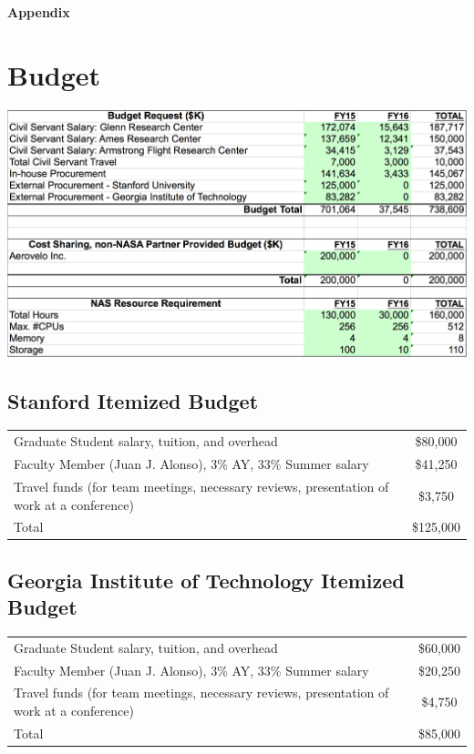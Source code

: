 \documentclass[]{aiaa-tc}
\begin{document}
  \clearpage
  

  

  \begin{landscape}
  \appendix
  \clearpage
  \centerline{\huge{\textbf{Appendix}}}
  \section{Budget}
    \centering
    \includegraphics[height=\textheight]{images/budget_request}
    \end{landscape}

  \subsection*{Stanford Itemized Budget}
    \begin{table}\begin{tabular}{l c}
    Graduate Student salary, tuition, and overhead &  \$80,000 \\
    Faculty Member (Juan J. Alonso), 3\% AY, 33\% Summer salary & \$41,250 \\
    Travel funds (for team meetings, necessary reviews, presentation of work at a conference) & \$3,750 \\
    \hline
    Total & \$125,000 \\ 
    \hline
    \end{tabular}\end{table}
  \subsection*{Georgia Institute of Technology Itemized Budget}

    \begin{table}\begin{tabular}{l c}
    Graduate Student salary, tuition, and overhead &  \$60,000 \\
    Faculty Member (Juan J. Alonso), 3\% AY, 33\% Summer salary & \$20,250 \\
    Travel funds (for team meetings, necessary reviews, presentation of work at a conference) & \$4,750 \\
    \hline
    Total & \$85,000 \\ 
    \hline
    \end{tabular}\end{table}
\end{document}
